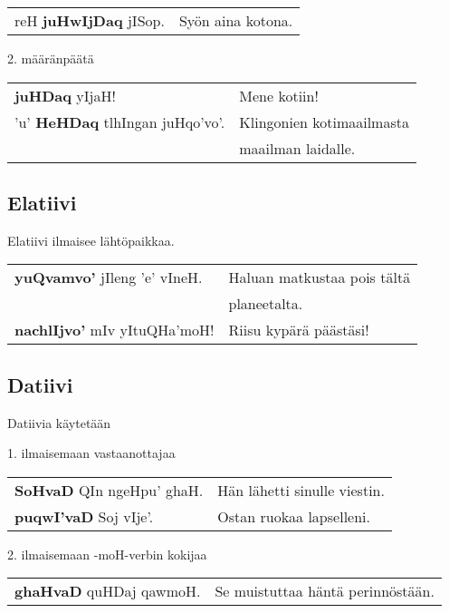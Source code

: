 \documentclass{book}
\begin{document}
\begin{tabular}{l l}
    reH \textbf{juHwIjDaq} jISop. & Syön aina kotona. \\
\end{tabular}

2. määränpäätä

\begin{tabular}{l l}
    \textbf{juHDaq} yIjaH! & Mene kotiin! \\
    'u' \textbf{HeHDaq} tlhIngan juHqo'vo'. & Klingonien kotimaailmasta \\
    & maailman laidalle. \\
\end{tabular}

\subsection{Elatiivi}

Elatiivi ilmaisee lähtöpaikkaa.

\begin{tabular}{l l}
    \textbf{yuQvamvo'} jIleng 'e' vIneH. & Haluan matkustaa pois tältä \\
    & planeetalta. \\
    \textbf{nachlIjvo'} mIv yItuQHa'moH! & Riisu kypärä päästäsi! \\
\end{tabular}

\subsection{Datiivi}

Datiivia käytetään

1. ilmaisemaan vastaanottajaa

\begin{tabular}{l l}
    \textbf{SoHvaD} QIn ngeHpu' ghaH. & Hän lähetti sinulle viestin. \\
    \textbf{puqwI'vaD} Soj vIje'. & Ostan ruokaa lapselleni. \\
\end{tabular}

2. ilmaisemaan -moH-verbin kokijaa

\begin{tabular}{l l}
    \textbf{ghaHvaD} quHDaj qawmoH. & Se muistuttaa häntä perinnöstään. \\
\end{tabular}
\end{document}
